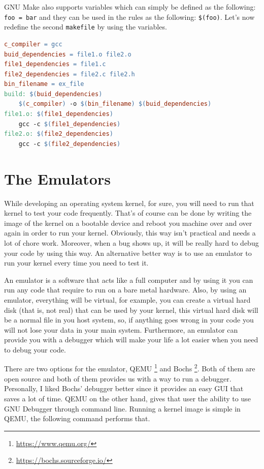 GNU Make also supports variables which can simply be defined as the
following: \lstinline!foo = bar! and they can be used in the rules as
the following: \lstinline!$(foo)!. Let's now redefine the second
\lstinline!makefile! by using the variables.

\begin{lstlisting}[language=make]
c_compiler = gcc
buid_dependencies = file1.o file2.o
file1_dependencies = file1.c
file2_dependencies = file2.c file2.h
bin_filename = ex_file
build: $(buid_dependencies)
    $(c_compiler) -o $(bin_filename) $(buid_dependencies)
file1.o: $(file1_dependencies)
    gcc -c $(file1_dependencies)
file2.o: $(file2_dependencies)
    gcc -c $(file2_dependencies)
\end{lstlisting}

\section{The Emulators}\label{the-emulators}

While developing an operating system kernel, for sure, you will need to
run that kernel to test your code frequently. That's of course can be
done by writing the image of the kernel on a bootable device and reboot
you machine over and over again in order to run your kernel. Obviously,
this way isn't practical and needs a lot of chore work. Moreover, when a
bug shows up, it will be really hard to debug your code by using this
way. An alternative better way is to use an emulator to run your kernel
every time you need to test it.

An emulator is a software that acts like a full computer and by using it
you can run any code that require to run on a bare metal hardware. Also,
by using an emulator, everything will be virtual, for example, you can
create a virtual hard disk (that is, not real) that can be used by your
kernel, this virtual hard disk will be a normal file in you host system,
so, if anything goes wrong in your code you will not lose your data in
your main system. Furthermore, an emulator can provide you with a
debugger which will make your life a lot easier when you need to debug
your code.

There are two options for the emulator, QEMU \footnote{\url{https://www.qemu.org/}}
and Bochs \footnote{\url{https://bochs.sourceforge.io/}}. Both of them
are open source and both of them provides us with a way to run a
debugger. Personally, I liked Bochs' debugger better since it provides
an easy GUI that saves a lot of time. QEMU on the other hand, gives that
user the ability to use GNU Debugger through command line. Running a
kernel image is simple in QEMU, the following command performs that.

